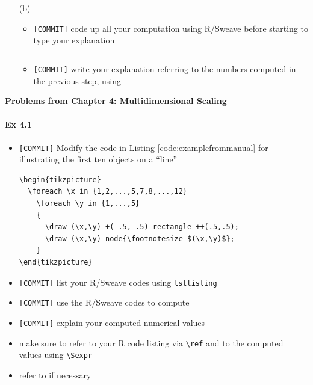 \documentclass[12pt]{article}
\begin{document}
\begin{itemize}
\begin{itemize}
         \end{itemize}
    \item[(b)] 
        \begin{itemize}
            \item \verb+[COMMIT]+ code up all your computation using R/Sweave
                before starting to type your explanation
\begin{lstlisting}
\end{lstlisting}
            \item \verb+[COMMIT]+ write your explanation referring to the
                numbers computed in the previous step, using
                \verb++
        \end{itemize}
\end{itemize}

\vskip0.25in
\begin{center}
    \textbf{Problems from Chapter 4: Multidimensional Scaling}
\end{center}

\paragraph{Ex 4.1}
\begin{itemize}
    \item \verb+[COMMIT]+ Modify the code in Listing \ref{code:examplefrommanual} for
        illustrating the first ten objects on a ``line''
\begin{center}
\begin{minipage}{0.65\textwidth}
\begin{lstlisting}[caption={TikZ Code for Figure
    \ref{fig:examplefrommanual}},label={code:examplefrommanual}]
\begin{tikzpicture}
  \foreach \x in {1,2,...,5,7,8,...,12}
    \foreach \y in {1,...,5}
    {
      \draw (\x,\y) +(-.5,-.5) rectangle ++(.5,.5);
      \draw (\x,\y) node{\footnotesize $(\x,\y)$};
    }
\end{tikzpicture}
\end{lstlisting}
\end{minipage}
\end{center}
    \item \verb+[COMMIT]+ list your R/Sweave codes using \verb+lstlisting+
    \item \verb+[COMMIT]+ use the R/Sweave codes to compute
    \item \verb+[COMMIT]+ explain your computed numerical values 
    \item make sure to refer to your R code listing via \verb+\ref+ and to the
        computed values using \verb+\Sexpr+
    \item refer to  \cite{tikzManual2012-11-04} if necessary
\end{itemize}
\end{document}
